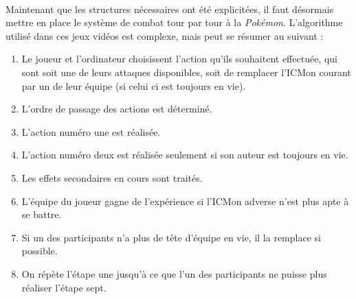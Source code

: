 \documentclass[12pt,a4paper, twoside]{article}
\begin{document}
        \paragraph{} Maintenant que les structures nécessaires ont été explicitées, il faut désormais mettre en place le système de combat tour par tour à la \emph{Pokémon}. L'algorithme utilisé dans ces jeux vidéos est complexe, mais peut se résumer au suivant :\\
        \begin{enumerate}
            \item Le joueur et l'ordinateur choisissent l'action qu'ils souhaitent effectuée, qui sont soit une de leurs attaques disponibles, soit de remplacer l'ICMon courant par un de leur équipe (si celui ci est toujours en vie).
            \item L'ordre de passage des actions est déterminé.
            \item L'action numéro une est réalisée.
            \item L'action numéro deux est réalisée seulement si son auteur est toujours en vie.
            \item Les effets secondaires en cours sont traités.
            \item L'équipe du joueur gagne de l'expérience si l'ICMon adverse n'est plus apte à se battre.
            \item Si un des participants n'a plus de tête d'équipe en vie, il la remplace si possible.
            \item On répète l'étape une jusqu'à ce que l'un des participants ne puisse plus réaliser l'étape sept.
        \end{enumerate}
\end{document}
